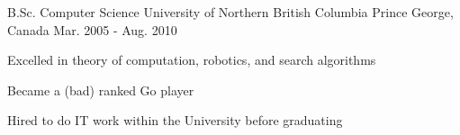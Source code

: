 

\begin{cventries}

  \cventry
    {B.Sc. Computer Science} %
    {University of Northern British Columbia} %
    {Prince George, Canada} %
    {Mar. 2005 - Aug. 2010} %
    {
      \begin{cvitems} %
      	\item {Excelled in theory of computation, robotics, and search algorithms}
		\item {Became a (bad) ranked Go player}
		\item {Hired to do IT work within the University before graduating}
      \end{cvitems}
    }

\end{cventries}
